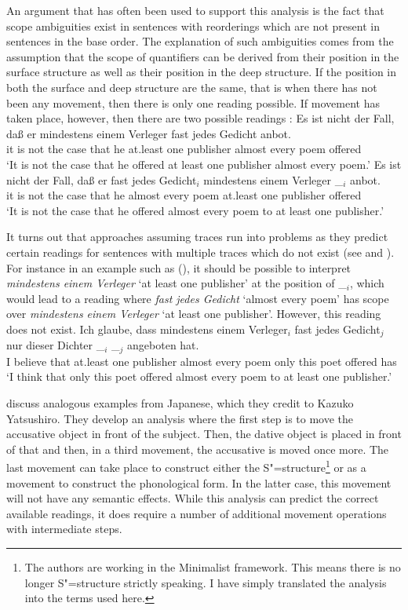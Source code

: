 %
An argument that has often been used to support this analysis is the fact that scope ambiguities
exist in sentences with reorderings which are not present in sentences in the base order. The explanation of such ambiguities comes from the assumption that the scope of quantifiers
can be derived from their position in the surface structure as well as their position in the deep structure. If the position in both the surface
and deep structure are the same, that is when there has not been any movement, then there is only one reading possible. If movement has taken place,
however, then there are two possible readings \citep[\page ]{Frey93a}:
\eal
\ex 
\gll Es ist nicht der Fall, daß er mindestens einem Verleger fast jedes Gedicht anbot.\\
     it is not the case that he at.least one publisher almost every poem offered\\
\glt `It is not the case that he offered at least one publisher almost every poem.'
\ex 
\gll Es ist nicht der Fall, daß er fast jedes Gedicht$_i$ mindestens einem Verleger \_$_i$ anbot.\\
	 it is not the case that he almost every poem at.least one publisher {} offered\\
\glt `It is not the case that he offered almost every poem to at least one publisher.'
\zl

\noindent
It turns out that approaches assuming traces run into problems as they predict certain readings for sentences with multiple traces which
do not exist (see \citealp[]{Kiss2001a} and \citealp[Section~2.6]{Fanselow2001a}). 
For instance in an example such as (), it should be possible to interpret \emph{mindestens einem Verleger} `at least one publisher' at
the position of \_$_i$, which would lead to a reading where \emph{fast jedes Gedicht} `almost every poem' has scope over \emph{mindestens einem Verleger} 
`at least one publisher'. However, this reading does not exist.
\ea
\gll Ich glaube, dass mindestens einem Verleger$_i$ fast jedes Gedicht$_j$ nur dieser Dichter \_$_i$ \_$_j$ angeboten hat.\\
	 I believe that at.least one publisher almost every poem only this poet {} {} offered has\\
\glt `I think that only this poet offered almost every poem to at least one publisher.'
\z

\citet[]{SE2002a} discuss analogous examples from Japanese, which they credit to Kazuko 
Yatsushiro. They develop an analysis where the first step is to move the accusative object in front of the subject.
Then, the dative object is placed in front of that and then, in a third movement, the accusative is moved once more. The last movement can
take place to construct either the S"=structure\footnote{
	The authors are working in the Minimalist framework. This means there is no longer S"=structure strictly speaking. I
	have simply translated the analysis into the terms used here.
}
or as a movement to construct the phonological form. In the latter case, this movement will not have any semantic effects.
While this analysis can predict the correct available readings, it does require a number of additional movement operations with intermediate steps.


